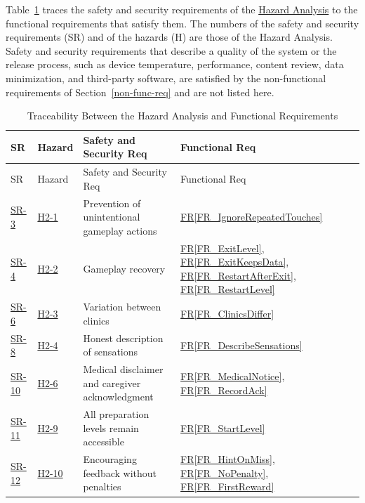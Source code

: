 \documentclass[12pt]{article}
\newcommand{\rref}[1]{\hyperref[#1]{FR\ref*{#1}}}
\newcommand{\haurl}{https://team-hindsight.github.io/ophthamology-game/HazardAnalysis/HazardAnalysis.pdf}
\newcommand{\hadoc}[1]{\href{\haurl}{#1}}
\newcommand{\hasrref}[2]{\href{\haurl\#nameddest=sr:#1}{SR-#2}}
\newcommand{\hahazref}[2]{\href{\haurl\#nameddest=haz:#1}{H#2}}
\begin{document}
Table~\ref{tab:HA2FRtm} traces the safety and security requirements of the
\hadoc{Hazard Analysis} to the functional requirements that satisfy them. The numbers
of the safety and security requirements (SR) and of the hazards (H) are those
of the Hazard Analysis. Safety and security requirements that describe a
quality of the system or the release process, such as device temperature,
performance, content review, data minimization, and third-party software, are
satisfied by the non-functional requirements of Section~\ref{non-func-req} and are
not listed here.

\begin{longtable}{p{} p{} >{\raggedright\arraybackslash}p{} >{\raggedright\arraybackslash}p{}}

\caption{Traceability Between the Hazard Analysis and Functional Requirements}
\label{tab:HA2FRtm}\\
\toprule
SR & Hazard & Safety and Security Req & Functional Req \\
\midrule
\endfirsthead
\toprule
SR & Hazard & Safety and Security Req & Functional Req \\
\midrule
\endhead
\hasrref{PreventAccidentalInput}{3} & \hahazref{AccidentalInputSkipping}{2-1} & Prevention of unintentional gameplay actions & \rref{FR_IgnoreRepeatedTouches} \\
\hasrref{GameplayRecovery}{4} & \hahazref{GameplayStuck}{2-2} & Gameplay recovery & \rref{FR_ExitLevel}, \rref{FR_ExitKeepsData}, \rref{FR_RestartAfterExit}, \rref{FR_RestartLevel} \\
\hasrref{ClinicsDiffer}{6} & \hahazref{InaccurateProcedure}{2-3} & Variation between clinics & \rref{FR_ClinicsDiffer} \\
\hasrref{HonestSensations}{8} & \hahazref{SensationsHidden}{2-4} & Honest description of sensations & \rref{FR_DescribeSensations} \\
\hasrref{MedicalDisclaimer}{10} & \hahazref{MisinterpretedMedicalPurpose}{2-6} & Medical disclaimer and caregiver acknowledgment & \rref{FR_MedicalNotice}, \rref{FR_RecordAck} \\
\hasrref{AllLevelsAccessible}{11} & \hahazref{RestrictedLevelAccess}{2-9} & All preparation levels remain accessible & \rref{FR_StartLevel} \\
\hasrref{NonPunitiveFeedback}{12} & \hahazref{PunitiveFeedback}{2-10} & Encouraging feedback without penalties & \rref{FR_HintOnMiss}, \rref{FR_NoPenalty}, \rref{FR_FirstReward} \\

\end{longtable}
\end{document}
